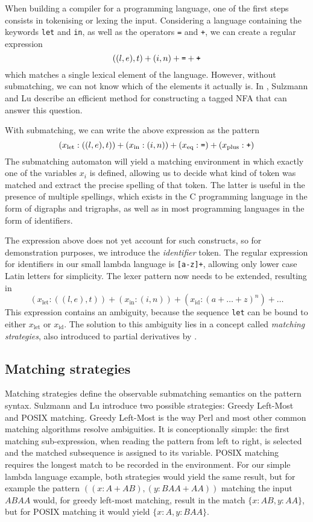 When building a compiler for a programming language, one of the first steps
consists in tokenising or lexing the input. Considering a language containing
the keywords \verb!let! and \verb!in!, as well as the operators \verb!=! and
\verb!+!, we can create a regular expression
%
\[((l,e),t) + (i,n) + \verb'=' + \verb'+'\]
%
which matches a single lexical element of the language. However, without
submatching, we can not know which of the elements it actually is. In
\cite{pdpat}, Sulzmann and Lu describe an efficient method for constructing a
tagged NFA that can answer this question.

With submatching, we can write the above expression as the pattern
%
\[(x_\text{let}:((l,e),t)) + (x_\text{in}:(i,n)) + (x_\text{eq}:\verb'=') +
(x_\text{plus}:\verb'+')\]
%
The submatching automaton will yield a matching environment in which exactly
one of the variables $x_i$ is defined, allowing us to decide what kind of token
was matched and extract the precise spelling of that token. The latter is useful
in the presence of multiple spellings, which exists in the C programming
language in the form of digraphs and trigraphs, as well as in most programming
languages in the form of identifiers.

The expression above does not yet account for such constructs, so for
demonstration purposes, we introduce the \textit{identifier} token. The regular
expression for identifiers in our small lambda language is \verb![a-z]+!,
allowing only lower case Latin letters for simplicity. The lexer pattern now
needs to be extended, resulting in
%
\[(x_\text{let}:((l,e),t)) + (x_\text{in}:(i,n)) + (x_\text{id}:(a+\dots+z)^n) +
\dots\]
%
This expression contains an ambiguity, because the sequence \verb!let! can be
bound to either $x_\text{let}$ or $x_\text{id}$. The solution to this ambiguity
lies in a concept called \textit{matching strategies}, also introduced to
partial derivatives by \cite{pdpat}.

\subsection{Matching strategies}

Matching strategies define the observable submatching semantics on the pattern
syntax. Sulzmann and Lu introduce two possible strategies: Greedy Left-Most and
POSIX matching. Greedy Left-Most is the way Perl and most other common matching
algorithms resolve ambiguities. It is conceptionally simple: the first matching
sub-expression, when reading the pattern from left to right, is selected and the
matched subsequence is assigned to its variable.
POSIX matching requires the longest match to be recorded in the environment. For
our simple lambda language example, both strategies would yield the same result,
but for example the pattern $((x:A+AB),(y:BAA+AA))$ matching the input $ABAA$
would, for greedy left-most matching, result in the match $\{x:AB, y:AA\}$, but
for POSIX matching it would yield $\{x:A, y:BAA\}$.

